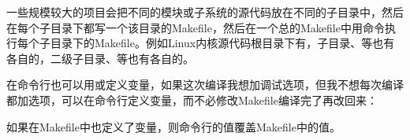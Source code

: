 一些规模较大的项目会把不同的模块或子系统的源代码放在不同的子目录中，然后在每个子目录下都写一个该目录的Makefile，然后在一个总的Makefile中用命令执行每个子目录下的Makefile。例如Linux内核源代码根目录下有，子目录、等也有各自的，二级子目录、等也有各自的。



在命令行也可以用\BookCode{=\BookSplit{}}或\BookCode{:\BookSplit{}=\BookSplit{}}定义变量，如果这次编译我想加调试选项，但我不想每次编译都加选项，可以在命令行定义变量，而不必修改Makefile编译完了再改回来：




如果在Makefile中也定义了变量，则命令行的值覆盖Makefile中的值。

